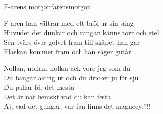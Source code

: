 \begin{song}{F-arens morgon}{farensmorgon}
\begin{vers}
F-aren han vältrar med ett bröl ur sin säng\\
Huvudet det dunkar och tungan känns torr och stel\\
Sen tvärs över golvet fram till skåpet han går\\
Flaskan kommer fram och han säger gutår\\
\end{vers}
\begin{vers}
Nollan, nollan, nollan ack vore jag som du\\
Du bangar aldrig ur och du dricker ju för sju\\
Du pallar för det mesta\\
Det är nåt hemskt vad du kan festa\\
Aj, vad det gungar, var fan finns det magnecyl?!!\\
\end{vers}
\end{song}
